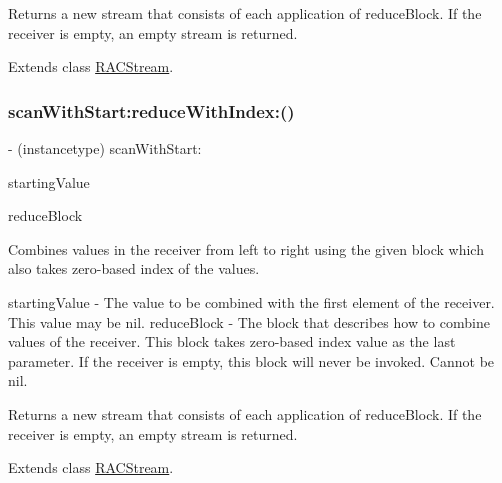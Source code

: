 Returns a new stream that consists of each application of {\ttfamily reduce\+Block}. If the receiver is empty, an empty stream is returned. 

Extends class \mbox{\hyperlink{interface_r_a_c_stream_a69cedeb6e96a6d4154f2256fdcbe27b1}{R\+A\+C\+Stream}}.

\mbox{\label{category_r_a_c_stream_07_operations_08_a69cedeb6e96a6d4154f2256fdcbe27b1}} 
\subsubsection{\texorpdfstring{scan\+With\+Start\+:reduce\+With\+Index\+:()}{scanWithStart:reduceWithIndex:()}\hspace{0.1cm}{\footnotesize\ttfamily [2/3]}}
{\footnotesize\ttfamily -\/ (instancetype) scan\+With\+Start\+: \begin{DoxyParamCaption}\item[{(id)}]{starting\+Value }\item[{reduceWithIndex:(id($^\wedge$)(id running, id next, N\+S\+U\+Integer index))}]{reduce\+Block }\end{DoxyParamCaption}}

Combines values in the receiver from left to right using the given block which also takes zero-\/based index of the values.

starting\+Value -\/ The value to be combined with the first element of the receiver. This value may be {\ttfamily nil}. reduce\+Block -\/ The block that describes how to combine values of the receiver. This block takes zero-\/based index value as the last parameter. If the receiver is empty, this block will never be invoked. Cannot be nil.

Returns a new stream that consists of each application of {\ttfamily reduce\+Block}. If the receiver is empty, an empty stream is returned. 

Extends class \mbox{\hyperlink{interface_r_a_c_stream_a69cedeb6e96a6d4154f2256fdcbe27b1}{R\+A\+C\+Stream}}.

\mbox{\label{category_r_a_c_stream_07_operations_08_a69cedeb6e96a6d4154f2256fdcbe27b1}} 
